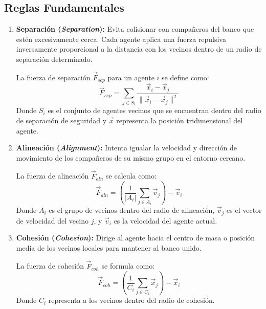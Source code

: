 \documentclass[12pt,a4paper]{article}
\begin{document}
\subsection{Reglas Fundamentales}
\begin{enumerate}
    \item \textbf{Separación (\textit{Separation}):} Evita colisionar con compañeros del banco que estén excesivamente cerca. Cada agente aplica una fuerza repulsiva inversamente proporcional a la distancia con los vecinos dentro de un radio de separación determinado.
    
    La fuerza de separación $\vec{F}_{sep}$ para un agente $i$ se define como:
    \begin{equation}
        \vec{F}_{sep} = \sum_{j \in S_i} \frac{\vec{x}_i - \vec{x}_j}{\|\vec{x}_i - \vec{x}_j\|^2}
    \end{equation}
    Donde $S_i$ es el conjunto de agentes vecinos que se encuentran dentro del radio de separación de seguridad y $\vec{x}$ representa la posición tridimensional del agente.

    \item \textbf{Alineación (\textit{Alignment}):} Intenta igualar la velocidad y dirección de movimiento de los compañeros de su mismo grupo en el entorno cercano.
    
    La fuerza de alineación $\vec{F}_{aln}$ se calcula como:
    \begin{equation}
        \vec{F}_{aln} = \left( \frac{1}{|A_i|} \sum_{j \in A_i} \vec{v}_j \right) - \vec{v}_i
    \end{equation}
    Donde $A_i$ es el grupo de vecinos dentro del radio de alineación, $\vec{v}_j$ es el vector de velocidad del vecino $j$, y $\vec{v}_i$ es la velocidad del agente actual.

    \item \textbf{Cohesión (\textit{Cohesion}):} Dirige al agente hacia el centro de masa o posición media de los vecinos locales para mantener al banco unido.
    
    La fuerza de cohesión $\vec{F}_{coh}$ se formula como:
    \begin{equation}
        \vec{F}_{coh} = \left( \frac{1}{C_i} \sum_{j \in C_i} \vec{x}_j \right) - \vec{x}_i
    \end{equation}
    Donde $C_i$ representa a los vecinos dentro del radio de cohesión.
\end{enumerate}
\end{document}

